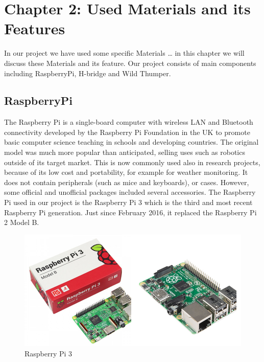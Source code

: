\section{Chapter 2: Used Materials and its Features} 
In our project we have used some specific Materials … in this chapter we will discuss these Materials and its feature. Our project consists of main components including RaspberryPi, H-bridge and Wild Thumper.

\subsection{ RaspberryPi  }
The Raspberry Pi is a single-board computer with wireless LAN and Bluetooth connectivity developed by the Raspberry Pi Foundation in the UK to promote basic computer science teaching in schools and developing countries. The original model was much more popular than anticipated, selling uses such as robotics outside of its target market. This is now commonly used also in research projects, because of its low cost and portability, for example for weather monitoring. It does not contain peripherals (such as mice and keyboards), or cases. However, some official and unofficial packages included several accessories. The Raspberry Pi used in our project is the Raspberry Pi 3 which is the third and most recent Raspberry Pi generation. Just since February 2016, it replaced the Raspberry Pi 2 Model B.

\begin{figure}[ht]
    \centering
    \includegraphics[width=1\textwidth]{figures/Raspberry Pi 3.png}
    \caption{Raspberry Pi 3}
\end{figure}

